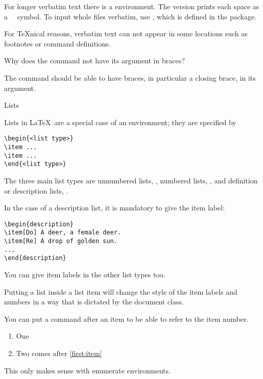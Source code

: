 For longer verbatim text there is a
 environment. The
 version prints each space
as a~\verb*+ + symbol.
To input whole files verbatim, use
\verb++, which is defined
in the  package.

For \TeX{}nical reasons, verbatim text can not appear in some
locations such as footnotes or command definitions.

\begin{594exercise}
Why does the  command not have its argument in braces?
\end{594exercise}
\begin{answer}
The  command should be able to have braces, in particular a
closing brace, in its argument.
\end{answer}

 {Lists}

Lists in \LaTeX\ are a special case of an environment; they are specified by
\begin{verbatim}
\begin{<list type>}
\item ...
\item ...
\end{<list type>}
\end{verbatim}
The three main list types are unnumbered lists,
, numbered lists,
, and definition or description lists,
.

In the case of a description list, it is mandatory to give the item
label:
\begin{verbatim}
\begin{description}
\item[Do] A deer, a female deer.
\item[Re] A drop of golden sun.
...
\end{description}
\end{verbatim}
You can give item labels in the other list types too.

Putting a list inside a list item will change the style of the item
labels and numbers in a way that is dictated by the document class.

You can put a  command after an
item to be able to refer to the item number.
\begin{examplewithcode}
\begin{enumerate}
\item\label{first:item} One
\item Two comes after \ref{first:item}
\end{enumerate}
\end{examplewithcode}
This only makes sense with
enumerate environments.


